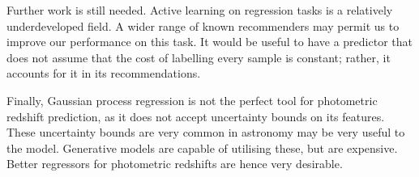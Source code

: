 \documentclass[11pt,twoside,openright]{report}
\begin{document}
Further work is still needed. Active learning on regression tasks is a relatively underdeveloped field. A wider range of known recommenders may permit us to improve our performance on this task. It would be useful to have a predictor that does not assume that the cost of labelling every sample is constant; rather, it accounts for it in its recommendations.

Finally, Gaussian process regression is not the perfect tool for photometric redshift prediction, as it does not accept uncertainty bounds on its features. These uncertainty bounds are very common in astronomy may be very useful to the model. Generative models are capable of utilising these, but are expensive. Better regressors for photometric redshifts are hence very desirable.

\nocite{*}
{}

\end{document}
